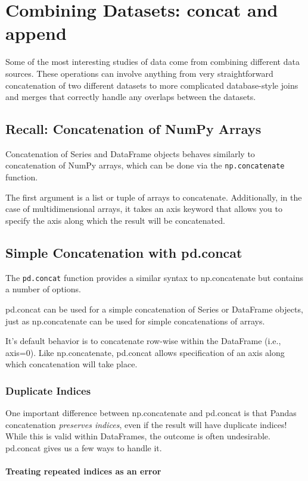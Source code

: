 \chapter{Combining Datasets: concat and append\label{Ch18}}
Some of the most interesting studies of data come from combining different data
sources. These operations can involve anything from very straightforward concatenation of two different datasets to more complicated database-style joins and merges
that correctly handle any overlaps between the datasets.
\section{Recall: Concatenation of NumPy Arrays}
Concatenation of Series and DataFrame objects behaves similarly to concatenation
of NumPy arrays, which can be done via the \verb|np.concatenate| function.

The first argument is a list or tuple of arrays to concatenate. Additionally, in the case
of multidimensional arrays, it takes an axis keyword that allows you to specify the
axis along which the result will be concatenated.


\section{Simple Concatenation with pd.concat}
The \verb|pd.concat| function provides a similar syntax to np.concatenate but contains a
number of options.

pd.concat can be used for a simple concatenation of Series or DataFrame objects,
just as np.concatenate can be used for simple concatenations of arrays.

It's default behavior is to concatenate row-wise within the DataFrame (i.e., axis=0).
Like np.concatenate, pd.concat allows specification of an axis along which concatenation will take place.
\subsection*{Duplicate Indices}
One important difference between np.concatenate and pd.concat is that Pandas
concatenation \emph{preserves indices}, even if the result will have duplicate indices! While this is valid within DataFrames, the
outcome is often undesirable. pd.concat gives us a few ways to handle it.
\subsubsection*{Treating repeated indices as an error}

